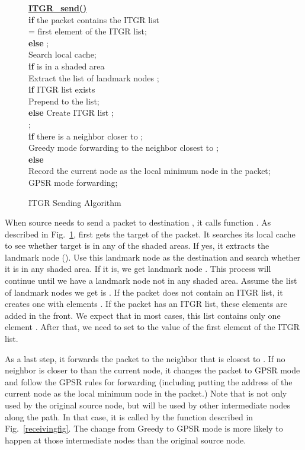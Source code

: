 \documentclass[3p,times]{elsarticle}
\begin{document}
\begin{figure}[hbt]
\baselineskip=10.2pt
{\small
  \noindent\underline{\bf ITGR\_send()} \\
  \text{~~~~}\textbf{if} the packet contains the ITGR list \\
  \text{~~~~~~~~} = first element of the ITGR list; \\
  \text{~~~~}\textbf{else} ; \\
  \text{~~~~}Search local cache; \\
  \text{~~~~}\textbf{if}  is in a shaded area \\
  \text{~~~~~~~~}Extract the list of landmark nodes ; \\
  \text{~~~~~~~~}\textbf{if} ITGR list exists \\
  \text{~~~~~~~~~~~~}Prepend  to the list; \\
  \text{~~~~~~~~}\textbf{else} Create ITGR list ;\\
  \text{~~~~~~~~}; \\
  \text{~~~~}\textbf{if} there is a neighbor closer to ; \\
  \text{~~~~~~~~}Greedy mode forwarding to the neighbor closest to ; \\
  \text{~~~~}\textbf{else}\\
  \text{~~~~~~~~}Record the current node as the local minimum node in the packet; \\
  \text{~~~~~~~~}GPSR mode forwarding; \\
}

\protect\caption{ITGR Sending Algorithm}
\protect\label{routingfig}
\end{figure}

When source  needs to send a packet to destination , it
calls function .
As described in Fig.~\ref{routingfig},
 first gets the target  of the packet.
It
searches its local cache to see
whether target  is in any of the shaded areas.
If yes, it extracts the landmark node ().
Use this landmark node  as the destination and search whether it is
in any shaded area. If it is, we get landmark node .
This process will continue until we have a landmark node 
not in any shaded area.
Assume the list of landmark nodes we get is .
If the packet does not contain an ITGR list, it creates one
with elements
.
If the packet has an ITGR list, these elements are added in
the front.
We expect that in most cases, this list contains only one element .
After that, we need to set  to the value of the first element
of the ITGR list.

As a last step, it forwards the packet to the neighbor
that is closest to .
If no neighbor is closer to  than the current node,
it changes the packet to GPSR mode
and follow the GPSR rules for forwarding (including putting
the address of the current node as the local minimum node in the packet.)
Note that  is not only used by the original source node,
but will be used by other intermediate nodes along the path.
In that case, it is called by the  function described in Fig.~\ref{receivingfig}.
The change from Greedy to GPSR mode is more likely to happen
at those intermediate nodes than the original source node.
\end{document}

